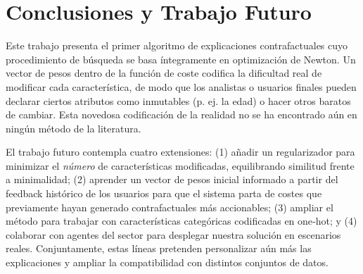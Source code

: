 \documentclass[12pt]{extarticle}
\numberwithin{equation}{section}
\begin{document}
\section*{Conclusiones y Trabajo Futuro}
Este trabajo presenta el primer algoritmo de explicaciones contrafactuales cuyo procedimiento de búsqueda se basa íntegramente en optimización de Newton. Un vector de pesos dentro de la función de coste codifica la dificultad real de modificar cada característica, de modo que los analistas o usuarios finales pueden declarar ciertos atributos como inmutables (p. ej. la edad) o hacer otros baratos de cambiar. Esta novedosa codificación de la realidad no se ha encontrado aún en ningún método de la literatura.

El trabajo futuro contempla cuatro extensiones: (1) añadir un regularizador para minimizar el \emph{número} de características modificadas, equilibrando similitud frente a minimalidad; (2) aprender un vector de pesos inicial informado a partir del feedback histórico de los usuarios para que el sistema parta de costes que previamente hayan generado contrafactuales más accionables; (3) ampliar el método para trabajar con características categóricas codificadas en one‑hot; y (4) colaborar con agentes del sector para desplegar nuestra solución en escenarios reales. Conjuntamente, estas líneas pretenden personalizar aún más las explicaciones y ampliar la compatibilidad con distintos conjuntos de datos.
\end{document}
